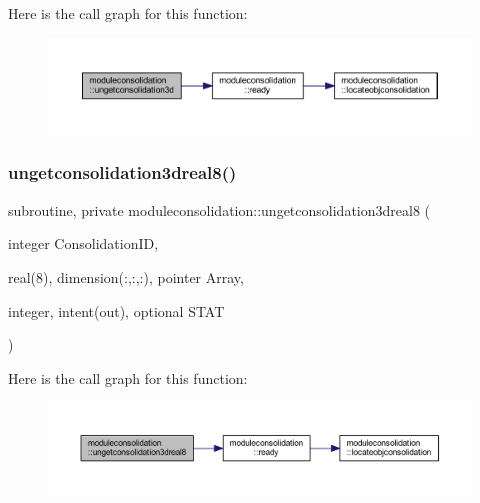 Here is the call graph for this function\+:\nopagebreak
\begin{figure}[H]
\begin{center}
\leavevmode
\includegraphics[width=350pt]{namespacemoduleconsolidation_affeed262d558e9c88366602767505b07_cgraph}
\end{center}
\end{figure}
\mbox{\label{namespacemoduleconsolidation_a2dbd54c6dd99b8f825bc7223f4e88f8b}} 
\subsubsection{\texorpdfstring{ungetconsolidation3dreal8()}{ungetconsolidation3dreal8()}}
{\footnotesize\ttfamily subroutine, private moduleconsolidation\+::ungetconsolidation3dreal8 (\begin{DoxyParamCaption}\item[{integer}]{Consolidation\+ID,  }\item[{real(8), dimension(\+:,\+:,\+:), pointer}]{Array,  }\item[{integer, intent(out), optional}]{S\+T\+AT }\end{DoxyParamCaption})\hspace{0.3cm}{\ttfamily [private]}}

Here is the call graph for this function\+:\nopagebreak
\begin{figure}[H]
\begin{center}
\leavevmode
\includegraphics[width=350pt]{namespacemoduleconsolidation_a2dbd54c6dd99b8f825bc7223f4e88f8b_cgraph}
\end{center}
\end{figure}
\mbox{\label{namespacemoduleconsolidation_abab71f3745fefbe658e80b47d85e3662}} 
